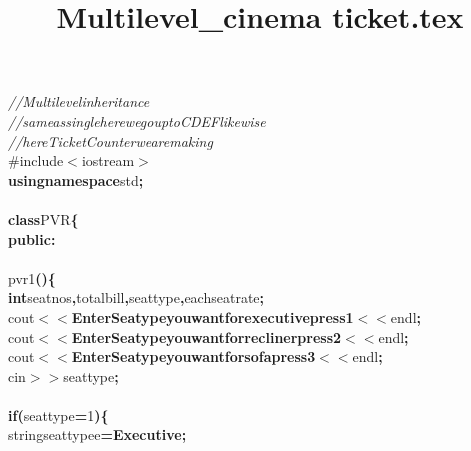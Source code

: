 \documentclass[a4paper, 18pt]{article}
\title{Multilevel_cinema ticket.tex}
\newcommand\SPC{\hspace*{0.6em}}
\newcommand\TAB{\hspace*{1.2em}}
\newcommand\QOT{\mbox{\char 34}}
\newcommand{\CppAComment}[1]{\textit{\textcolor[rgb]{0,0.47,0.84}{#1}}}
\newcommand{\CppAIdentifier}[1]{#1}
\newcommand{\CppANumber}[1]{\textcolor[rgb]{0.5,0,0.5}{#1}}
\newcommand{\CppAPreprocessor}[1]{\textcolor[rgb]{0,0.5,0}{#1}}
\newcommand{\CppAReservedWord}[1]{\textbf{#1}}
\newcommand{\CppASpace}[1]{\colorbox[rgb]{1,1,1}{#1}}
\newcommand{\CppAString}[1]{\textbf{\textcolor[rgb]{0,0,1}{#1}}}
\newcommand{\CppASymbol}[1]{\textbf{\textcolor[rgb]{1,0,0}{#1}}}
\begin{document}
\begin{ttfamily}
\noindent
\CppAComment{//Multilevel\SPC inheritance}\\
\CppAComment{//same\SPC as\SPC single\SPC here\SPC we\SPC go\SPC up\SPC to\SPC C\SPC D\SPC E\SPC F\SPC like\SPC wise\SPC }\\
\CppAComment{//here\SPC Ticket\SPC Counter\SPC we\SPC are\SPC making}\\
\CppAPreprocessor{\#include$<$iostream$>$}\\
\CppAReservedWord{using}\CppASpace{\SPC }\CppAReservedWord{namespace}\CppASpace{\SPC }\CppAIdentifier{std}\CppASymbol{;}\\
\\
\CppAReservedWord{class}\CppASpace{\SPC }\CppAIdentifier{PVR}\CppASymbol{\{}\\
\CppASpace{\TAB }\CppAReservedWord{public}\CppASymbol{:}\\
\CppASpace{\TAB \TAB }\\
\CppASpace{\TAB \TAB }\CppAIdentifier{pvr1}\CppASymbol{(}\CppASymbol{)}\CppASymbol{\{}\\
\CppASpace{\TAB \TAB \TAB }\CppAReservedWord{int}\CppASpace{\SPC }\CppAIdentifier{seatnos}\CppASymbol{,}\CppAIdentifier{totalbill}\CppASymbol{,}\CppAIdentifier{seattype}\CppASymbol{,}\CppAIdentifier{eachseatrate}\CppASymbol{;}\\
\CppASpace{\TAB \TAB \TAB }\CppAIdentifier{cout}\CppASymbol{$<$$<$}\CppAString{\QOT Enter\SPC Seatype\SPC you\SPC want\SPC for\SPC executive\SPC press\SPC 1\QOT }\CppASymbol{$<$$<$}\CppAIdentifier{endl}\CppASymbol{;}\\
\CppASpace{\TAB \TAB \TAB }\CppAIdentifier{cout}\CppASymbol{$<$$<$}\CppAString{\QOT Enter\SPC Seatype\SPC you\SPC want\SPC for\SPC recliner\SPC press\SPC 2\QOT }\CppASymbol{$<$$<$}\CppAIdentifier{endl}\CppASymbol{;}\\
\CppASpace{\TAB \TAB \TAB }\CppAIdentifier{cout}\CppASymbol{$<$$<$}\CppAString{\QOT Enter\SPC Seatype\SPC you\SPC want\SPC for\SPC sofa\SPC press\SPC 3\QOT }\CppASymbol{$<$$<$}\CppAIdentifier{endl}\CppASymbol{;}\\
\CppASpace{\TAB \TAB \TAB }\CppAIdentifier{cin}\CppASymbol{$>$$>$}\CppAIdentifier{seattype}\CppASymbol{;}\\
\CppASpace{\TAB \TAB \TAB }\\
\CppASpace{\TAB \TAB \TAB }\CppAReservedWord{if}\CppASymbol{(}\CppAIdentifier{seattype}\CppASymbol{=}\CppANumber{1}\CppASymbol{)}\CppASymbol{\{}\\
\CppASpace{\TAB \TAB \TAB \TAB }\CppAIdentifier{string}\CppASpace{\SPC }\CppAIdentifier{seattypee}\CppASpace{\SPC }\CppASymbol{=}\CppAString{\QOT Executive\QOT }\CppASymbol{;}\\

\end{ttfamily}
\end{document}
